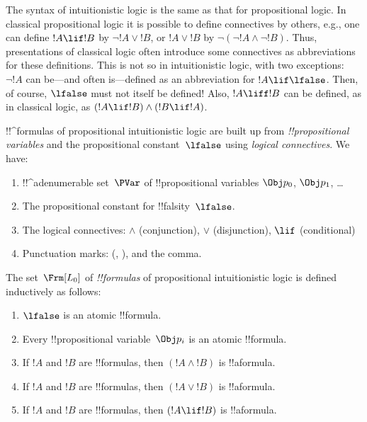 \documentclass[../../../include/open-logic-section]{subfiles}
\begin{document}

The syntax of intuitionistic logic is the same as that for
propositional logic. In classical propositional logic it is possible
to define connectives by others, e.g., one can define $!A \lif !B$ by
$\lnot !A \lor !B$, or $!A \lor !B$ by $\lnot(\lnot !A \land \lnot
!B)$. Thus, presentations of classical logic often introduce some
connectives as abbreviations for these definitions. This is not so in
intuitionistic logic, with two exceptions: $\lnot !A$ can be---and
often is---defined as an abbreviation for $!A \lif \lfalse$. Then, of
course, $\lfalse$ must not itself be defined!{} Also, $!A \liff !B$
can be defined, as in classical logic, as $(!A \lif !B) \land (!B \lif
!A)$.

!!^{formula}s of propositional intuitionistic logic are built up from
\emph{!!{propositional variable}s} and the propositional
constant~$\lfalse$ using \emph{logical connectives}. We have:

\begin{enumerate}
\item !!^a{denumerable} set~$\PVar$ of !!{propositional variable}s $\Obj p_0$,
  $\Obj p_1$, \dots
  \item The propositional constant for !!{falsity}~$\lfalse$.
\item The logical connectives: $\land$
  (conjunction), $\lor$ (disjunction), $\lif$ (conditional)
\item Punctuation marks: (, ), and the comma.
\end{enumerate}

\begin{defn}[Formula]
 The set~$\Frm[L_0]$ of \emph{!!{formula}s} of
propositional intuitionistic logic is defined inductively as follows:
\begin{enumerate}
\item $\lfalse$ is an atomic !!{formula}.

\item Every !!{propositional variable}~$\Obj p_i$ is an atomic
  !!{formula}.

\item If $!A$ and $!B$ are !!{formula}s, then $(!A \land
  !B)$ is !!a{formula}.

\item If $!A$ and $!B$ are !!{formula}s, then $(!A \lor !B)$
  is !!a{formula}.

\item If $!A$ and $!B$ are !!{formula}s, then $(!A \lif !B)$
  is !!a{formula}.

\end{enumerate}
\end{defn}
\end{document}
